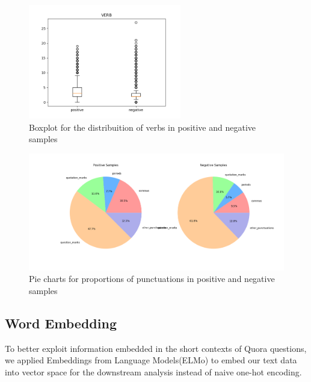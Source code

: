 \documentclass[12pt]{diazessay} %
\begin{document}
\begin{figure} 
	\includegraphics[height=5cm, center]{graphs/verb.png}
	\caption{Boxplot for the distribuition of verbs in positive and negative samples}
	\medskip
	\small
	\label{figure:verb_box}

\end{figure}


\begin{figure} 
	\includegraphics[width=\textwidth, center]{graphs/puncpiecharts.png}
	\caption{Pie charts for proportions of punctuations in positive and negative samples}
	\medskip
	\small
	\label{figure:puncpie}
\end{figure}


\subsection{Word Embedding}

To better exploit information embedded in the short contexts of Quora questions, we applied Embeddings from Language Models(ELMo) to embed our text data into vector space for the downstream analysis instead of naive one-hot encoding.
\end{document}
